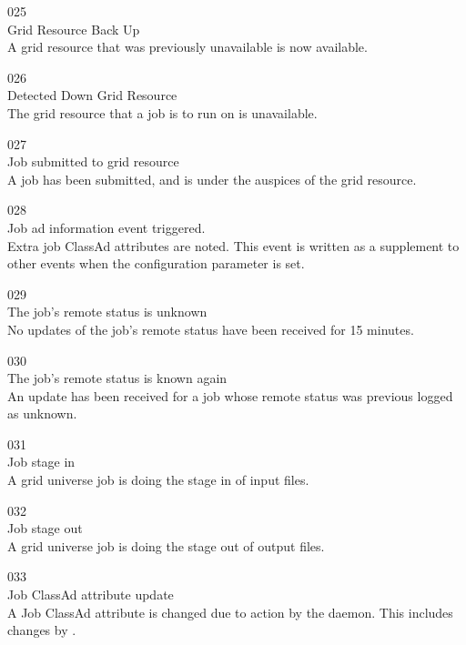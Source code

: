 \noindent{} 025 \\
 Grid Resource Back Up \\
 A grid resource that was previously
unavailable is now available.

\noindent{} 026 \\
 Detected Down Grid Resource \\
 The grid resource that a job is to
run on is unavailable.

\noindent{} 027 \\
 Job submitted to grid resource \\
 A job has been submitted,
and is under the auspices of the grid resource.

\noindent{} 028 \\
 Job ad information event triggered. \\
 Extra job ClassAd attributes are noted. This event is
written as a supplement to other events when the configuration
parameter  is set.

\noindent{} 029 \\
 The job's remote status is unknown \\
 No updates of the job's remote status
have been received for 15 minutes.

\noindent{} 030 \\
 The job's remote status is known again \\
 An update has been received for a job whose
remote status was previous logged as unknown.

\noindent{} 031 \\
 Job stage in \\
 A grid universe job is doing the stage in of 
input files.

\noindent{} 032 \\
 Job stage out \\
 A grid universe job is doing the  stage out of
output files.

\noindent{} 033 \\
 Job ClassAd attribute update \\
 A Job ClassAd attribute is changed due to action
by the  daemon.  
This includes changes by .

